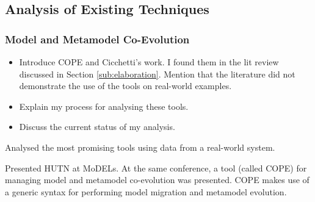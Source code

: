 \subsection{Analysis of Existing Techniques}
\label{sub:analysis_of_existing_techniques}


\subsubsection{Model and Metamodel Co-Evolution}
\begin{itemize}
	\item Introduce COPE and Cicchetti's work. I found them in the lit review discussed in Section \ref{sub:elaboration}. Mention that the literature did not demonstrate the use of the tools on real-world examples. 
	\item Explain my process for analysing these tools.
	\item Discuss the current status of my analysis.
\end{itemize}

    Analysed the most promising tools using data from a real-world system.

    Presented HUTN at MoDELs. At the same conference, a tool (called COPE) for managing model and metamodel co-evolution was presented. COPE makes use of a generic syntax for performing model migration and metamodel evolution.
